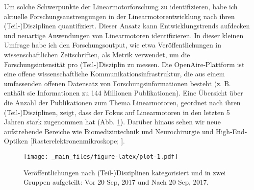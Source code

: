 \documentclass[
  oneside]{book}
\begin{document}
Um solche Schwerpunkte der Linearmotorforschung zu identifizieren, habe ich aktuelle Forschungsanstrengungen in der Linearmotorentwicklung nach ihren (Teil-)Disziplinen quantifiziert. Dieser Ansatz kann Entwicklungstrends aufdecken und neuartige Anwendungen von Linearmotoren identifizieren. In dieser kleinen Umfrage habe ich den Forschungsoutput, wie etwa Veröffentlichungen in wissenschaftlichen Zeitschriften, als Metrik verwendet, um die Forschungsintensität pro (Teil-)Disziplin zu messen. Die OpenAire-Plattform \citep{openaireconsortium} ist eine offene wissenschaftliche Kommunikationsinfrastruktur, die aus einem umfassenden offenen Datensatz von Forschungsinformationen besteht (z. B. enthält sie Informationen zu 144 Millionen Publikationen). Eine Übersicht über die Anzahl der Publikationen zum Thema Linearmotoren, geordnet nach ihren (Teil-)Disziplinen, zeigt, dass der Fokus auf Linearmotoren in den letzten 5 Jahren stark zugenommen hat (Abb. \ref{fig:plot}). Darüber hinaus sehen wir neue aufstrebende Bereiche wie Biomedizintechnik und Neurochirurgie \citep{alberto2018, zamanian2019, fromme2019, do2019} und High-End-Optiken {[}Rasterelektronenmikroskope; \citet{mo2017}{]}.

\begin{figure}
\centering
\texttt{[image: \_main\_files/figure-latex/plot-1.pdf]}
\caption{\label{fig:plot}Veröffentlichungen nach (Teil-)Disziplinen kategorisiert und in zwei Gruppen aufgeteilt: Vor 20 Sep, 2017 und Nach 20 Sep, 2017.}
\end{figure}
\end{document}

